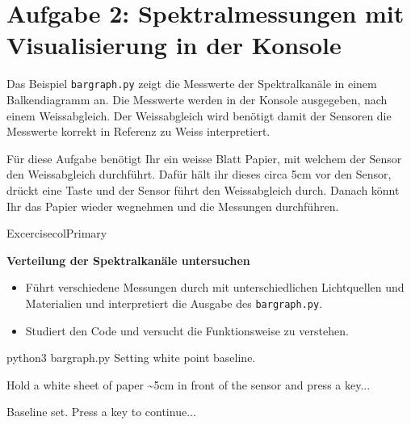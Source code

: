 \documentclass[
  11pt,
  a4paper,
  oneside, openany  ,captions=tableheading
]{scrbook}
\newenvironment{Shaded}{\begin{snugshade}}{\end{snugshade}}
\newcommand{\ExtensionTok}[1]{\textcolor[rgb]{0.00,0.23,0.31}{#1}}
\newcommand{\NormalTok}[1]{\textcolor[rgb]{0.00,0.23,0.31}{#1}}
\providecommand{\tightlist}{%
  \setlength{\itemsep}{0pt}\setlength{\parskip}{0pt}}
\theoremstyle{remark}
\renewcommand{\markright}[1]{\def\chaptertitle{#1}} %
\begin{document}
\section*{Aufgabe 2: Spektralmessungen mit Visualisierung in der
Konsole}\label{aufgabe-2-spektralmessungen-mit-visualisierung-in-der-konsole}

\markright{Aufgabe 2: Spektralmessungen mit Visualisierung in der
Konsole}

Das Beispiel \texttt{bargraph.py} zeigt die Messwerte der Spektralkanäle
in einem Balkendiagramm an. Die Messwerte werden in der Konsole
ausgegeben, nach einem Weissabgleich. Der Weissabgleich wird benötigt
damit der Sensoren die Messwerte korrekt in Referenz zu Weiss
interpretiert.

Für diese Aufgabe benötigt Ihr ein weisse Blatt Papier, mit welchem der
Sensor den Weissabgleich durchführt. Dafür hält ihr dieses circa 5cm vor
den Sensor, drückt eine Taste und der Sensor führt den Weissabgleich
durch. Danach könnt Ihr das Papier wieder wegnehmen und die Messungen
durchführen.

\begin{boxtitle}{Excercise}{colPrimary}

\textbf{Verteilung der Spektralkanäle untersuchen}

\begin{itemize}
\tightlist
\item
  Führt verschiedene Messungen durch mit unterschiedlichen Lichtquellen
  und Materialien und interpretiert die Ausgabe des
  \texttt{bargraph.py}.
\item
  Studiert den Code und versucht die Funktionsweise zu verstehen.
\end{itemize}

\end{boxtitle}

\begin{Shaded}
\begin{Highlighting}[]
\ExtensionTok{python3}\NormalTok{ bargraph.py }
\ExtensionTok{Setting}\NormalTok{ white point baseline.}

\ExtensionTok{Hold}\NormalTok{ a white sheet of paper \textasciitilde{}5cm in front of the sensor and press a key...}

\ExtensionTok{Baseline}\NormalTok{ set. Press a key to continue...   }
\end{Highlighting}
\end{Shaded}
\end{document}
